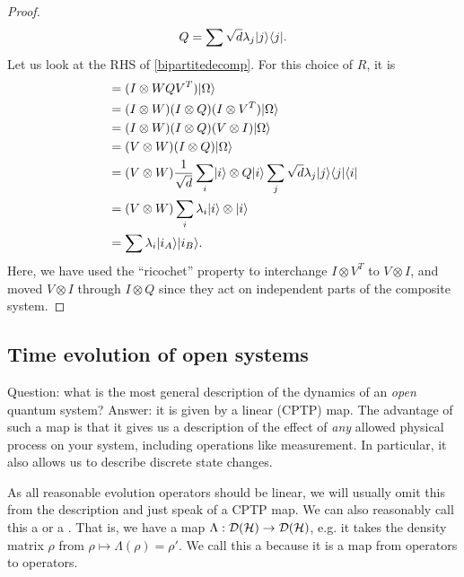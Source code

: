 \begin{itemize}
\begin{proof}
        \begin{equation}
            Q=\sum \sqrt{d} \lambda_j \lvert j\rangle\langle j\rvert.
        \end{equation}
        Let us look at the RHS of \ref{bipartitedecomp}. For this choice of $R$, it is
        \begin{align*}
            &=(I\otimes WQV^T) \lvert\Omega\rangle\\
            &=(I\otimes W)(I\otimes Q)(I\otimes V^T)\lvert\Omega\rangle\\
            &=(I\otimes W)(I\otimes Q)(V\otimes I)\lvert\Omega\rangle\\
            &= (V\otimes W)(I\otimes Q) \lvert\Omega\rangle\\
            &= (V\otimes W) \frac{1}{\sqrt{d}} \sum_i \lvert i\rangle\otimes Q\lvert i\rangle \sum_j \sqrt{d} \lambda_j \lvert j\rangle\langle j\rvert\langle i\rvert\\
            &=(V\otimes W) \sum_i \lambda_i \lvert i\rangle\otimes \lvert i\rangle\\
            &= \sum \lambda_i \lvert i_A\rangle \lvert i_B\rangle.\qedhere
        \end{align*}
        Here, we have used the ``ricochet'' property to interchange $I\otimes V^T$ to $V\otimes I$, and moved $V\otimes I$ through $I\otimes Q$ since they act on independent parts of the composite system.
    \end{proof}
\end{itemize}

\subsection*{Time evolution of open systems}
Question: what is the most general description of the dynamics of an \emph{open} quantum system? Answer: it is given by a linear  (CPTP) map. The advantage of such a map is that it gives us a description of the effect of \emph{any} allowed physical process on your system, including operations like measurement. In particular, it also allows us to describe discrete state changes.

As all reasonable evolution operators should be linear, we will usually omit this from the description and just speak of a CPTP map. We can also reasonably call this a  or a . That is, we have a map $\Lambda:\mathcal{D}(\mathcal H)\to \mathcal{D}(\mathcal H)$, e.g. it takes the density matrix $\rho$ from $\rho\mapsto \Lambda(\rho)=\rho'$. We call this a  because it is a map from operators to operators.

